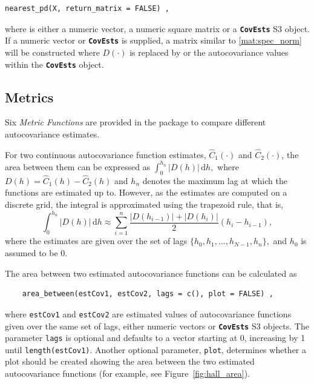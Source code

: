 \begin{verbatim}
nearest_pd(X, return_matrix = FALSE) ,
\end{verbatim}

where  is either a numeric vector, a numeric square matrix or a
\textbf{\texttt{CovEsts}} S3 object. If a numeric vector or
\textbf{\texttt{CovEsts}} is supplied, a matrix similar to
\eqref{mat:spec_norm} will be constructed where \(D(\cdot)\) is replaced
by  or the autocovariance values within the
\textbf{\texttt{CovEsts}} object.

\subsection{Metrics}\label{metrics}

Six \emph{Metric Functions} are provided in the package to compare
different autocovariance estimates.

For two continuous autocovariance function estimates,
\(\widehat{C}_{1}(\cdot)\) and \(\widehat{C}_{2}(\cdot)\), the area
between them can be expressed as
\(\int_{0}^{h_{n}} \left| D(h) \right| \, \text{d}h ,\) where
\(D(h) = \widehat{C}_{1}(h) - \widehat{C}_{2}(h)\) and \(h_{n}\) denotes
the maximum lag at which the functions are estimated up to. However, as
the estimates are computed on a discrete grid, the integral is
approximated using the trapezoid rule, that is,
\[\int_{0}^{h_{n}} \left| D(h) \right| \, \text{d}h 
\approx \sum_{i = 1}^{n} \frac{\left| D(h_{i - 1}) \right| + \left| D(h_{i}) \right|}{2} (h_{i} - h_{i-1}) ,\]
where the estimates are given over the set of lags
\(\{h_{0} , h_{1} , \dots , h_{N - 1}, h_{n} \},\) and \(h_{0}\) is
assumed to be 0.

The area between two estimated autocovariance functions can be
calculated as

\begin{verbatim}
    area_between(estCov1, estCov2, lags = c(), plot = FALSE) ,
\end{verbatim}

where \texttt{estCov1} and \texttt{estCov2} are estimated values of
autocovariance functions given over the same set of lags, either numeric
vectors or \textbf{\texttt{CovEsts}} S3 objects. The parameter
\texttt{lags} is optional and defaults to a vector starting at 0,
increasing by 1 until \texttt{length(estCov1)}. Another optional
parameter, \texttt{plot}, determines whether a plot should be created
showing the area between the two estimated autocovariance functions (for
example, see Figure~\ref{fig:hall_area}).

